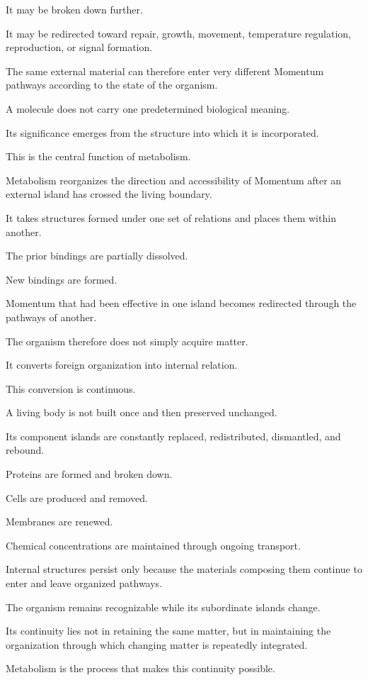 It may be broken down further.

It may be redirected toward repair, growth, movement, temperature regulation, reproduction, or signal formation.

The same external material can therefore enter very different Momentum pathways according to the state of the organism.

A molecule does not carry one predetermined biological meaning.

Its significance emerges from the structure into which it is incorporated.

This is the central function of metabolism.

Metabolism reorganizes the direction and accessibility of Momentum after an external island has crossed the living boundary.

It takes structures formed under one set of relations and places them within another.

The prior bindings are partially dissolved.

New bindings are formed.

Momentum that had been effective in one island becomes redirected through the pathways of another.

The organism therefore does not simply acquire matter.

It converts foreign organization into internal relation.

This conversion is continuous.

A living body is not built once and then preserved unchanged.

Its component islands are constantly replaced, redistributed, dismantled, and rebound.

Proteins are formed and broken down.

Cells are produced and removed.

Membranes are renewed.

Chemical concentrations are maintained through ongoing transport.

Internal structures persist only because the materials composing them continue to enter and leave organized pathways.

The organism remains recognizable while its subordinate islands change.

Its continuity lies not in retaining the same matter, but in maintaining the organization through which changing matter is repeatedly integrated.

Metabolism is the process that makes this continuity possible.

